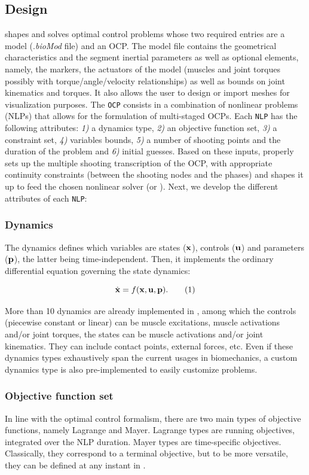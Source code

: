 \subsection{Design}
\bioptim shapes and solves optimal control problems whose two required entries are a model (.\textit{bioMod} file) and an OCP.
The model file contains the geometrical characteristics and the segment inertial parameters as well as optional elements, namely, the markers, the actuators of the model (muscles and joint torques possibly with torque/angle/velocity relationships) as well as bounds on joint kinematics and torques. 
It also allows the user to design or import meshes for visualization purposes.
The \texttt{OCP} consists in a combination of nonlinear problems (NLPs) that allows for the formulation of multi-staged OCPs. 
Each \texttt{NLP} has the following attributes: \textit{1)} a dynamics type, \textit{2)} an objective function set, \textit{3)} a constraint set, \textit{4)} variables bounds, \textit{5)} a number of shooting points and the duration of the problem and \textit{6)} initial guesses.
Based on these inputs, \bioptim properly sets up the multiple shooting transcription of the OCP, with appropriate continuity constraints (between the shooting nodes and the phases) and shapes it up to feed the chosen nonlinear solver (\ipopt or \acados). 
Next, we develop the different attributes of each \texttt{NLP}:

\subsubsection{Dynamics}
The dynamics defines which variables are states ($\mathbf{x}$), controls ($\mathbf{u}$) and parameters ($\mathbf{p}$), the latter being time-independent.
Then, it implements the ordinary differential equation governing the state dynamics:

\[
\dstate = f(\state, \control, \param).
\addtag
\label{eq:state_transition}
\]

\noindent More than 10 dynamics are already implemented in \bioptim, among which the controls (piecewise constant or linear) can be muscle excitations, muscle activations and/or joint torques, the states can be muscle activations and/or joint kinematics.
They can include contact points, external forces, etc.
Even if these dynamics types exhaustively span the current usages in biomechanics, a custom dynamics type is also pre-implemented to easily customize problems.

\subsubsection{Objective function set}
In line with the optimal control formalism, there are two main types of objective functions, namely Lagrange and Mayer. 
Lagrange types are running objectives, integrated over the NLP duration. Mayer types are time-specific objectives. 
Classically, they correspond to a terminal objective, but to be more versatile, they can be defined at any instant in \bioptim.

